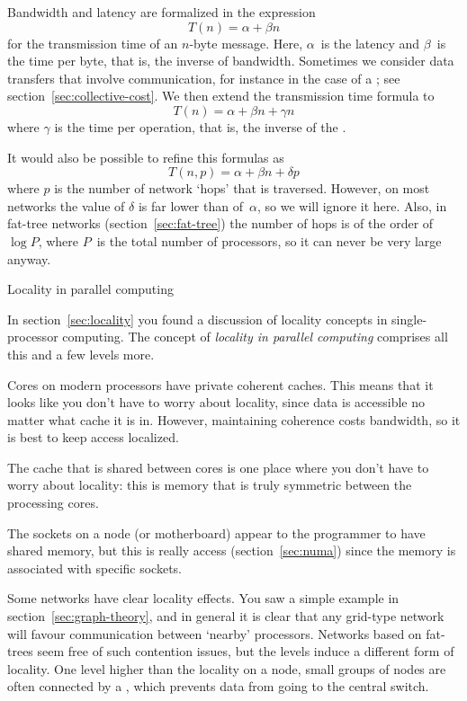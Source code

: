 Bandwidth and latency are formalized in the expression
\[ T(n)=\alpha+\beta n \]
for the transmission time of an $n$-byte message. Here, $\alpha$~is
the latency and $\beta$~is the time per byte, that is, the inverse of
bandwidth. Sometimes we consider data transfers that involve
communication, for instance in the case of a ; see section~\ref{sec:collective-cost}. We then extend
the transmission time formula to
\[ T(n)=\alpha+\beta n+\gamma n \]
where $\gamma$ is the time per operation, that is, the inverse of the
.

It would also be possible to refine this formulas as
\[ T(n,p) = \alpha+\beta n+\delta p \]
where $p$ is the number of network `hops' that is traversed. However,
on most networks the value of $\delta$ is far lower than of~$\alpha$,
so we will ignore it here. Also, in fat-tree networks
(section~\ref{sec:fat-tree}) the number of hops is of the order of
$\log P$, where $P$~is the total number of processors, so it can never
be very large anyway.

 {Locality in parallel computing}
\label{sec:parallel-local}

In section~\ref{sec:locality} you found a discussion of 
locality concepts in single-processor computing.
The concept of \emph{locality in parallel computing}
comprises all this and a few levels more.

 Cores on modern processors have
private coherent caches. This means that
 it looks like you don't have to worry about locality, since data
  is accessible no matter what cache it is in. However, maintaining coherence
  costs bandwidth, so it is best to keep access localized.

 The cache that is shared between cores
is one place where you don't have to worry about locality: this is memory that
is truly symmetric between the processing cores.

 The sockets on a node (or motherboard)
appear to the programmer to have shared memory, but this is really 
 access (section~\ref{sec:numa}) since the memory is
associated with specific sockets.

 Some networks have clear locality effects.
You saw a simple example in section~\ref{sec:graph-theory}, and 
in general it is clear that any grid-type network will favour communication
between `nearby' processors. Networks based on fat-trees seem free of such
contention issues, but the levels induce a different form of locality.
One level higher than the locality on a node, small groups of nodes
are often connected by a , 
which prevents data from going to the central switch.

